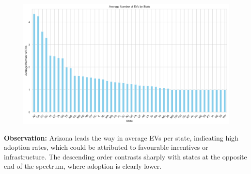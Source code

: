 \documentclass[
  letterpaper,
  DIV=11,
  numbers=noendperiod]{scrartcl}
\begin{document}
\begin{figure}[H]

{\centering \includegraphics{SummaryPaper_FinalProject_T1_files/figure-pdf/cell-16-output-1.png}

}

\end{figure}

\textbf{Observation:} Arizona leads the way in average EVs per state,
indicating high adoption rates, which could be attributed to favourable
incentives or infrastructure. The descending order contrasts sharply
with states at the opposite end of the spectrum, where adoption is
clearly lower.
\end{document}
